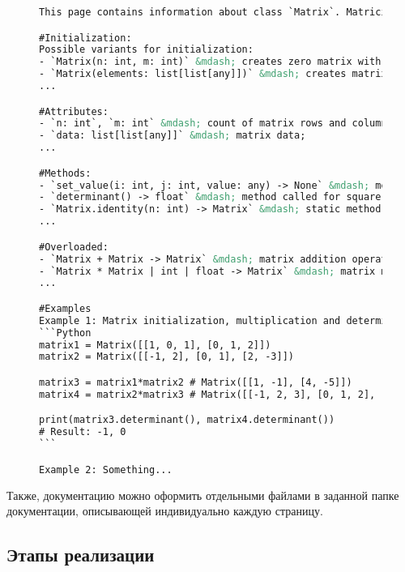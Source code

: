 	\begin{figure}[H]
		\begin{lstlisting}[language=XML, caption=Краткий пример страницы <<Matrix>> на языке <<Markdown>>]
This page contains information about class `Matrix`. Matricies are basic algebraic objects, used in math...

#Initialization:
Possible variants for initialization:
- `Matrix(n: int, m: int)` &mdash; creates zero matrix with `n` rows and `m` columns;
- `Matrix(elements: list[list[any]])` &mdash; creates matrix with default values;
...

#Attributes:
- `n: int`, `m: int` &mdash; count of matrix rows and columns;
- `data: list[list[any]]` &mdash; matrix data;
...

#Methods:
- `set_value(i: int, j: int, value: any) -> None` &mdash; method sets value for `i` row and `j` column;
- `determinant() -> float` &mdash; method called for square matrix, which return its determinant;
- `Matrix.identity(n: int) -> Matrix` &mdash; static method which returns square identity matrix with size `n`;
...

#Overloaded:
- `Matrix + Matrix -> Matrix` &mdash; matrix addition operator;
- `Matrix * Matrix | int | float -> Matrix` &mdash; matrix multiplication operator;
...

#Examples
Example 1: Matrix initialization, multiplication and determinant usage
```Python
matrix1 = Matrix([[1, 0, 1], [0, 1, 2]])
matrix2 = Matrix([[-1, 2], [0, 1], [2, -3]])

matrix3 = matrix1*matrix2 # Matrix([[1, -1], [4, -5]])
matrix4 = matrix2*matrix3 # Matrix([[-1, 2, 3], [0, 1, 2], [2, -3, -4]])

print(matrix3.determinant(), matrix4.determinant())
# Result: -1, 0
```

Example 2: Something...
		\end{lstlisting}
	\end{figure}

	Также, документацию можно оформить отдельными файлами в заданной папке документации, описывающей индивидуально каждую страницу.



\subsection{Этапы реализации}

